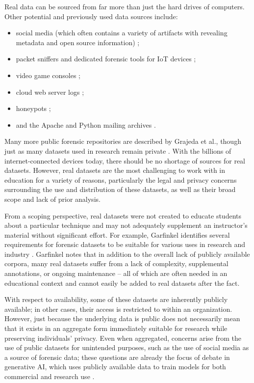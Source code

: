 \documentclass[letterpaper,12pt]{report}
\def\tightlist{}
\begin{document}
Real data can be sourced from far more than just the hard drives of
computers. Other potential and previously used data sources include:

\begin{itemize}
\tightlist
\item
  social media (which often contains a variety of artifacts with
  revealing metadata and open source information)
  \cite{baggiliDataSourcesAdvancing2015};
\item
  packet sniffers and dedicated forensic tools for IoT devices
  \cite{meffertForensicStateAcquisition2017};
\item
  video game consoles
  \cite{grajedaAvailabilityDatasetsDigital2017,pessolanoForensicAnalysisNintendo2019};
\item
  cloud web server logs \cite{rahmanNewWebForensic2020};
\item
  honeypots \cite{mochForensicImageGenerator2009};
\item
  and the Apache and Python mailing archives
  \cite{grajedaAvailabilityDatasetsDigital2017}.
\end{itemize}

Many more public forensic repositories are described by Grajeda et al.,
though just as many datasets used in research remain private
\cite{grajedaAvailabilityDatasetsDigital2017}. With the billions of
internet-connected devices today, there should be no shortage of sources
for real datasets. However, real datasets are the most challenging to
work with in education for a variety of reasons, particularly the legal
and privacy concerns surrounding the use and distribution of these
datasets, as well as their broad scope and lack of prior analysis.

From a scoping perspective, real datasets were not created to educate
students about a particular technique and may not adequately supplement
an instructor's material without significant effort. For example,
Garfinkel identifies several requirements for forensic datasets to be
suitable for various uses in research and industry
\cite{garfinkelForensicCorporaChallenge2007}. Garfinkel notes that
in addition to the overall lack of publicly available corpora, many real
datasets suffer from a lack of complexity, supplemental annotations, or
ongoing maintenance -- all of which are often needed in an educational
context and cannot easily be added to real datasets after the fact.

With respect to availability, some of these datasets are inherently
publicly available; in other cases, their access is restricted to within
an organization. However, just because the underlying data is public
does not necessarily mean that it exists in an aggregate form
immediately suitable for research while preserving individuals' privacy.
Even when aggregated, concerns arise from the use of public datasets for
unintended purposes, such as the use of social media as a source of
forensic data; these questions are already the focus of debate in
generative AI, which uses publicly available data to train models for
both commercial and research use
\cite{avrahamiOwnershipCreativityGenerative2021,eshraghianHumanOwnershipArtificial2020,rooseAIgeneratedPictureWon2022}.
\end{document}
